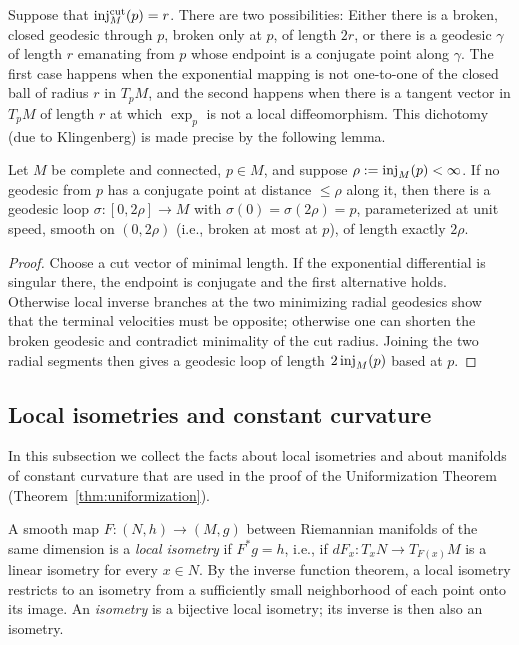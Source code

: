 Suppose that  $\operatorname{inj}_M^{\rm cut}(p)=r$. There are two possibilities:
Either there is a broken, closed geodesic through $p$, broken only
at $p$, of length $2r$, or there is a geodesic $\gamma$ of length
$r$ emanating from $p$ whose endpoint is a conjugate point along
$\gamma$. The first case happens when the exponential mapping is not
one-to-one of the closed ball of radius $r$ in $T_pM$, and the
second happens when there is a tangent vector in $T_pM$ of length
$r$ at which $\exp_p$ is not a local diffeomorphism.
This dichotomy (due to Klingenberg) is made precise by the
following lemma.

\begin{lemma}
\label{lem:klingenberg-loop}


Let $M$ be complete and connected, $p\in M$, and suppose
$\rho:=\operatorname{inj}_M(p)<\infty$. If no geodesic from $p$ has a conjugate point at distance
$\le\rho$ along it, then there is a geodesic loop $\sigma\colon
[0,2\rho]\to M$ with $\sigma(0)=\sigma(2\rho)=p$, parameterized at
unit speed, smooth on $(0,2\rho)$ (i.e., broken at most at $p$), of
length exactly $2\rho$.
\end{lemma}

\begin{proof}
\sketch
{}
Choose a cut vector of minimal length. If the exponential differential is singular there, the endpoint is conjugate and the first alternative holds. Otherwise local inverse branches at the two minimizing radial geodesics show that the terminal velocities must be opposite; otherwise one can shorten the broken geodesic and contradict minimality of the cut radius. Joining the two radial segments then gives a geodesic loop of length $2\operatorname{inj}_M(p)$ based at $p$.
\end{proof}

\subsection{Local isometries and constant curvature}

In this subsection we collect the facts about local isometries and
about manifolds of constant curvature that are used in the proof of
the Uniformization Theorem (Theorem~\ref{thm:uniformization}).

\begin{definition}
\label{def:local-isometry}



A smooth map $F\colon (N,h)\to (M,g)$ between Riemannian manifolds
of the same dimension is a {\sl local isometry} if $F^*g=h$, i.e.,
if $dF_x\colon T_xN\to T_{F(x)}M$ is a linear isometry for every
$x\in N$. By the inverse function theorem, a local isometry
restricts to an isometry from a sufficiently small neighborhood of
each point onto its image. An {\sl isometry} is a bijective local
isometry; its inverse is then also an isometry.
\end{definition}

